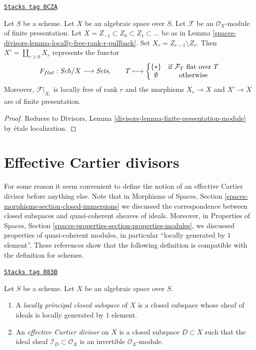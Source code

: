 \begin{lemma}
\label{spaces-divisors-lemma-finite-presentation-module}
\href{https://stacks.math.columbia.edu/tag/0CZA}{\texttt{Stacks tag 0CZA}}

Let $S$ be a scheme. Let $X$ be an algebraic space over $S$.
Let $\mathcal{F}$ be an $\mathcal{O}_X$-module
of finite presentation. Let $X = Z_{-1} \subset Z_0 \subset Z_1 \subset \ldots$
be as in Lemma \ref{spaces-divisors-lemma-locally-free-rank-r-pullback}.
Set $X_r = Z_{r - 1} \setminus Z_r$.
Then $X' = \coprod_{r \geq 0} X_r$ represents the functor
$$
F_{flat} : \mathit{Sch}/X \longrightarrow \textit{Sets},\quad\quad
T \longmapsto
\left\{
\begin{matrix}
\{*\} & \text{if }\mathcal{F}_T\text{ flat over }T\\
\emptyset & \text{otherwise}
\end{matrix}
\right.
$$
Moreover, $\mathcal{F}|_{X_r}$ is locally free of rank $r$ and the
morphisms $X_r \to X$ and $X' \to X$ are of finite presentation.
\end{lemma}

\begin{proof}
Reduces to
Divisors, Lemma \ref{divisors-lemma-finite-presentation-module}
by \'etale localization.
\end{proof}

\section{Effective Cartier divisors}
\label{spaces-divisors-section-effective-Cartier-divisors}
For some reason it seem convenient to define the notion of an effective
Cartier divisor before anything else. Note that in
Morphisms of Spaces, Section \ref{spaces-morphisms-section-closed-immersions}
we discussed the correspondence between closed subspaces and quasi-coherent
sheaves of ideals. Moreover, in
Properties of Spaces, Section
\ref{spaces-properties-section-properties-modules}, we discussed properties
of quasi-coherent modules, in particular ``locally generated by $1$ element''.
These references show that the following definition is
compatible with the definition for schemes.

\begin{definition}
\label{spaces-divisors-definition-effective-Cartier-divisor}
\href{https://stacks.math.columbia.edu/tag/083B}{\texttt{Stacks tag 083B}}

Let $S$ be a scheme. Let $X$ be an algebraic space over $S$.
\begin{enumerate}
\item A {\it locally principal closed subspace} of $X$ is a closed subspace
whose sheaf of ideals is locally generated by $1$ element.
\item An {\it effective Cartier divisor} on $X$ is a closed subspace
$D \subset X$ such that the ideal sheaf $\mathcal{I}_D \subset \mathcal{O}_X$
is an invertible $\mathcal{O}_X$-module.
\end{enumerate}
\end{definition}

